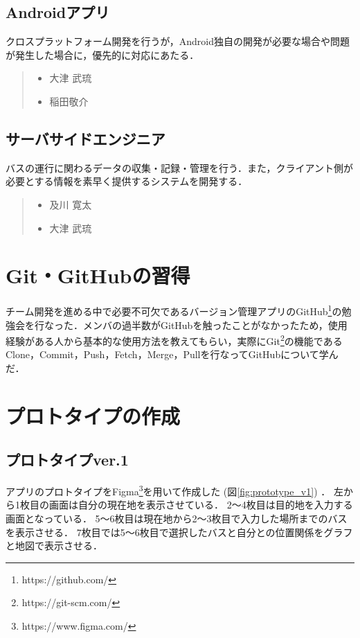 \subsection{Androidアプリ}
クロスプラットフォーム開発を行うが，Android独自の開発が必要な場合や問題が発生した場合に，優先的に対応にあたる．
\begin{quote}
    \begin{itemize}
        \item 大津 武琉
        \item 稲田敬介
    \end{itemize}
\end{quote}

\subsection{サーバサイドエンジニア}
バスの運行に関わるデータの収集・記録・管理を行う．また，クライアント側が必要とする情報を素早く提供するシステムを開発する．
\begin{quote}
    \begin{itemize}
        \item 及川 寛太
        \item 大津 武琉
    \end{itemize}
\end{quote}

\section{Git・GitHubの習得}
チーム開発を進める中で必要不可欠であるバージョン管理アプリのGitHub\footnote{https://github.com/}の勉強会を行なった．メンバの過半数がGitHubを触ったことがなかったため，使用経験がある人から基本的な使用方法を教えてもらい，実際にGit\footnote{https://git-scm.com/}の機能であるClone，Commit，Push，Fetch，Merge，Pullを行なってGitHubについて学んだ．

\section{プロトタイプの作成}
\subsection{プロトタイプver.1}
アプリのプロトタイプをFigma\footnote{https://www.figma.com/}を用いて作成した (図\ref{fig:prototype_v1}) ．
左から1枚目の画面は自分の現在地を表示させている．
2〜4枚目は目的地を入力する画面となっている．
5〜6枚目は現在地から2〜3枚目で入力した場所までのバスを表示させる．
7枚目では5〜6枚目で選択したバスと自分との位置関係をグラフと地図で表示させる．

